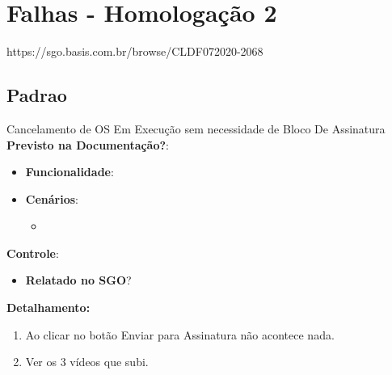 
\section{Falhas - Homologação 2}


https://sgo.basis.com.br/browse/CLDF072020-2068

\subsection{Padrao}
\begin{falha}[0]{Cancelamento de OS Em Execução sem necessidade de Bloco De Assinatura}
	\textbf{Previsto na Documentação?}: \mschecksim
	\begin{itemize}
		\item \textbf{Funcionalidade}:\sosFq
		\item \textbf{Cenários}:
		\begin{itemize}
			\item \sosFqCu
		\end{itemize}
		
	\end{itemize}
	
	\textbf{Controle}:
	\begin{itemize}
		\item \textbf{Relatado no SGO}? \mschecksim %
	\end{itemize}
	
	\tcblower
	
	\textbf{Detalhamento:}
	\begin{enumerate}
		\item Ao clicar no botão Enviar para Assinatura não acontece nada.
		\item Ver os 3 vídeos que subi.
	\end{enumerate}
	
\end{falha}
